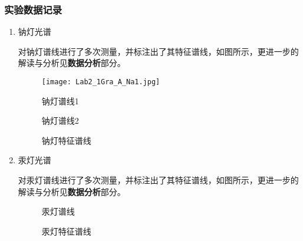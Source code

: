 \documentclass[dvipsnames, svgnames,a4paper,11pt]{article}
\begin{document}
	\subsubsection{实验数据记录}
	\begin{enumerate}
		\item 钠灯光谱
		
		对钠灯谱线进行了多次测量，并标注出了其特征谱线，如图所示，更进一步的解读与分析见\textbf{数据分析}部分。
		
		\begin{figure}[htbp]
			\centering
			\texttt{[image: Lab2\_1Gra\_A\_Na1.jpg]}
			\caption{钠灯谱线1}
			\label{fig:figA1}
		\end{figure}
		
		\begin{figure}[htbp]
			\centering
			\caption{钠灯谱线2}
			\label{fig:figA2}			
		\end{figure}
		
		\begin{figure}[htbp]
			\centering
			\caption{钠灯特征谱线}
			\label{fig:figA3}			
		\end{figure}
		
		\item 汞灯光谱
		
		对汞灯谱线进行了多次测量，并标注出了其特征谱线，如图所示，更进一步的解读与分析见\textbf{数据分析}部分。
		
		\begin{figure}[htbp]
			\centering
			\caption{汞灯谱线}
			\label{fig:figA4}			
		\end{figure}
		
		\begin{figure}[htbp]
			\centering
			\caption{汞灯特征谱线}
			\label{fig:figA5}			
		\end{figure}
		

\end{enumerate}
\end{document}
